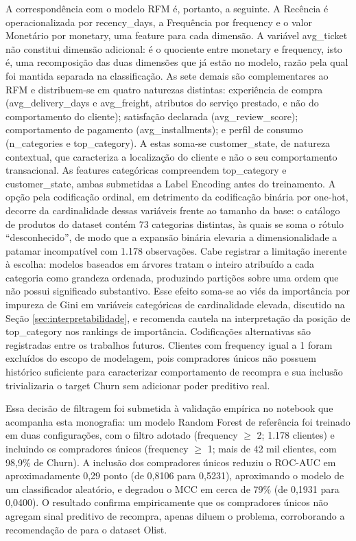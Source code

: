 A correspondência com o modelo RFM é, portanto, a seguinte. A Recência é operacionalizada por recency\_days, a Frequência por frequency e o valor Monetário por monetary, uma feature para cada dimensão. A variável avg\_ticket não constitui dimensão adicional: é o quociente entre monetary e frequency, isto é, uma recomposição das duas dimensões que já estão no modelo, razão pela qual foi mantida separada na classificação. As sete demais são complementares ao RFM e distribuem-se em quatro naturezas distintas: experiência de compra (avg\_delivery\_days e avg\_freight, atributos do serviço prestado, e não do comportamento do cliente); satisfação declarada (avg\_review\_score); comportamento de pagamento (avg\_installments); e perfil de consumo (n\_categories e top\_category). A estas soma-se customer\_state, de natureza contextual, que caracteriza a localização do cliente e não o seu comportamento transacional. As features categóricas compreendem top\_category e customer\_state, ambas submetidas a Label Encoding antes do treinamento. A opção pela codificação ordinal, em detrimento da codificação binária por one-hot, decorre da cardinalidade dessas variáveis frente ao tamanho da base: o catálogo de produtos do dataset contém 73 categorias distintas, às quais se soma o rótulo ``desconhecido'', de modo que a expansão binária elevaria a dimensionalidade a patamar incompatível com 1.178 observações. Cabe registrar a limitação inerente à escolha: modelos baseados em árvores tratam o inteiro atribuído a cada categoria como grandeza ordenada, produzindo partições sobre uma ordem que não possui significado substantivo. Esse efeito soma-se ao viés da importância por impureza de Gini em variáveis categóricas de cardinalidade elevada, discutido na Seção \ref{sec:interpretabilidade}, e recomenda cautela na interpretação da posição de top\_category nos rankings de importância. Codificações alternativas são registradas entre os trabalhos futuros. Clientes com frequency igual a 1 foram excluídos do escopo de modelagem, pois compradores únicos não possuem histórico suficiente para caracterizar comportamento de recompra e sua inclusão trivializaria o target Churn sem adicionar poder preditivo real.

Essa decisão de filtragem foi submetida à validação empírica no notebook que acompanha esta monografia: um modelo Random Forest de referência foi treinado em duas configurações, com o filtro adotado (frequency $\geq$ 2; 1.178 clientes) e incluindo os compradores únicos (frequency $\geq$ 1; mais de 42 mil clientes, com 98,9\% de Churn). A inclusão dos compradores únicos reduziu o ROC-AUC em aproximadamente 0,29 ponto (de 0,8106 para 0,5231), aproximando o modelo de um classificador aleatório, e degradou o MCC em cerca de 79\% (de 0,1931 para 0,0400). O resultado confirma empiricamente que os compradores únicos não agregam sinal preditivo de recompra, apenas diluem o problema, corroborando a recomendação de  para o dataset Olist.

